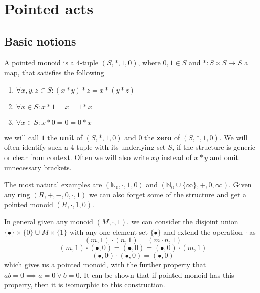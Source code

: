 \chapter{Pointed acts}
\section{Basic notions}
\begin{definition}
    A pointed monoid is a $4$-tuple $(S,\ast,1,0)$, where $0,1\in S$ and $\ast: S\times S \to S$ a map, that satisfies the following
    \begin{enumerate}
        \item $\forall x,y,z\in S: (x\ast y)\ast z = x\ast(y\ast z)$
        \item $\forall x\in S: x\ast 1 = x = 1\ast x$
        \item $\forall x\in S: x\ast 0 = 0 = 0\ast x$
    \end{enumerate}
    we will call $1$ the \textbf{unit} of $(S,\ast,1,0)$ and $0$ the \textbf{zero} of $(S,\ast,1,0)$. We will often identify
    such a $4$-tuple with its underlying set $S$, if the structure is generic or clear from context. Often we will also write
    $xy$ instead of $x\ast y$ and omit unnecessary brackets.
\end{definition}
\begin{example}
    The most natural examples are $(\mathbb{N}_0, \cdot, 1,0)$ and $(\mathbb{N}_0\cup\{\infty\}, +,0,\infty)$. Given any ring $(R,+,-,0,\cdot,1)$ 
    we can also forget some of the structure and get a pointed monoid $(R,\cdot,1,0)$.  
\end{example}
\begin{example}
    In general given any monoid $(M,\cdot,1)$, we can consider the disjoint union $\{\bullet\}\times\{0\}\cup M\times\{1\}$ with any one element set
    $\{\bullet\}$ and extend the operation $\cdot$ as
    \[
        (m,1)\cdot(n,1) = (m\cdot n,1)
    \]
    \[
        (m,1)\cdot(\bullet, 0) = (\bullet, 0) = (\bullet,0)\cdot(m,1)
    \]
    \[
        (\bullet,0)\cdot(\bullet,0) = (\bullet,0)
    \]
    which gives us a pointed monoid, with the further property that $ab=0 \implies a=0 \lor b=0$. It can be shown that if pointed monoid 
    has this property, then it is isomorphic to this construction.
\end{example}

